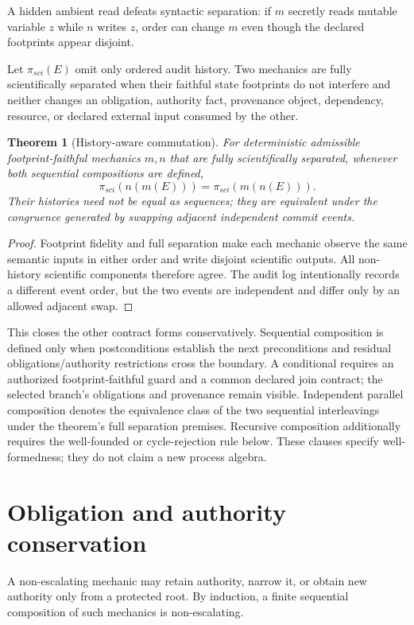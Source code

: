 \documentclass[11pt]{article}
\newtheorem{theorem}{Theorem}
\begin{document}
A hidden ambient read defeats syntactic separation: if $m$ secretly reads mutable variable $z$ while $n$ writes $z$, order can change $m$ even though the declared footprints appear disjoint.

Let $\pi_{sci}(E)$ omit only ordered audit history. Two mechanics are fully scientifically separated when their faithful state footprints do not interfere and neither changes an obligation, authority fact, provenance object, dependency, resource, or declared external input consumed by the other.

\begin{theorem}[History-aware commutation]
For deterministic admissible footprint-faithful mechanics $m,n$ that are fully scientifically separated, whenever both sequential compositions are defined,
\[
\pi_{sci}(n(m(E)))=\pi_{sci}(m(n(E))).
\]
Their histories need not be equal as sequences; they are equivalent under the congruence generated by swapping adjacent independent commit events.
\end{theorem}
\begin{proof}
Footprint fidelity and full separation make each mechanic observe the same semantic inputs in either order and write disjoint scientific outputs. All non-history scientific components therefore agree. The audit log intentionally records a different event order, but the two events are independent and differ only by an allowed adjacent swap.
\end{proof}

This closes the other contract forms conservatively. Sequential composition is
defined only when postconditions establish the next preconditions and residual
obligations/authority restrictions cross the boundary. A conditional requires
an authorized footprint-faithful guard and a common declared join contract;
the selected branch's obligations and provenance remain visible. Independent
parallel composition denotes the equivalence class of the two sequential
interleavings under the theorem's full separation premises. Recursive
composition additionally requires the well-founded or cycle-rejection rule
below. These clauses specify well-formedness; they do not claim a new process
algebra.

\section{Obligation and authority conservation}
A non-escalating mechanic may retain authority, narrow it, or obtain new authority only from a protected root. By induction, a finite sequential composition of such mechanics is non-escalating.
\end{document}
